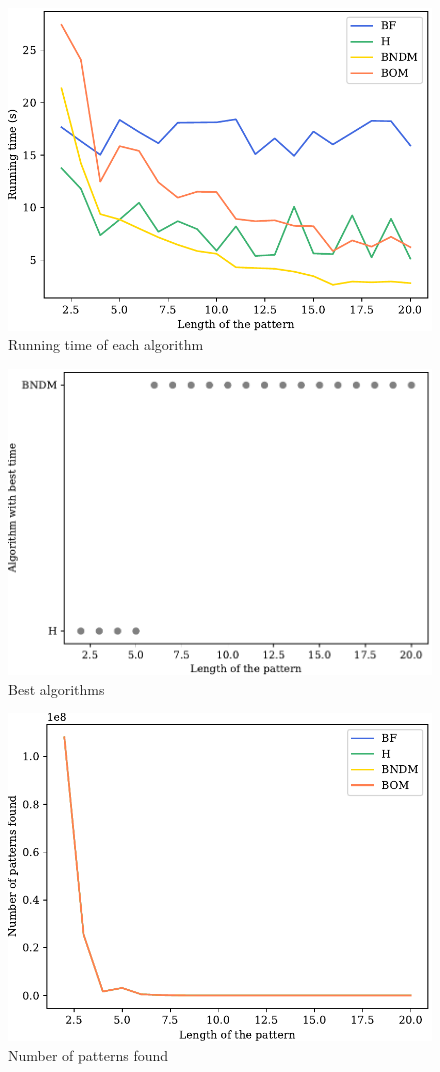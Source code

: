 \documentclass[a4paper, 10pt]{article}
\begin{document}
\begin{figure}[htbp]
	\centering
	\includegraphics[width=0.75\linewidth]{time.pdf}
	\caption{Running time of each algorithm}
	\label{fig:time}
\end{figure}

\begin{figure}[htbp]
	\centering
	\includegraphics[width=0.75\linewidth]{best.pdf}
	\caption{Best algorithms}
	\label{fig:best}
\end{figure}

\begin{figure}[htbp]
	\centering
	\includegraphics[width=0.75\linewidth]{found.pdf}
	\caption{Number of patterns found}
	\label{fig:found}
\end{figure}
\end{document}
